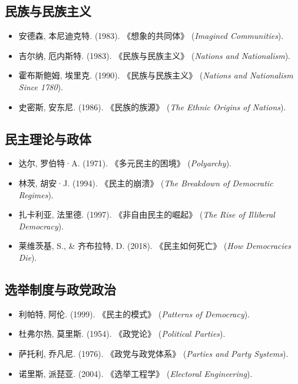\documentclass[a5paper, 11pt, openany]{ctexbook}
\begin{document}
\subsection*{民族与民族主义}
\begin{itemize}
    \item 安德森, 本尼迪克特. (1983). 《想象的共同体》 (\textit{Imagined Communities}).
    \item 吉尔纳, 厄内斯特. (1983). 《民族与民族主义》 (\textit{Nations and Nationalism}).
    \item 霍布斯鲍姆, 埃里克. (1990). 《民族与民族主义》 (\textit{Nations and Nationalism Since 1780}).
    \item 史密斯, 安东尼. (1986). 《民族的族源》 (\textit{The Ethnic Origins of Nations}).
\end{itemize}

\subsection*{民主理论与政体}
\begin{itemize}
    \item 达尔, 罗伯特·A. (1971). 《多元民主的困境》 (\textit{Polyarchy}).
    \item 林茨, 胡安·J. (1994). 《民主的崩溃》 (\textit{The Breakdown of Democratic Regimes}).
    \item 扎卡利亚, 法里德. (1997). 《非自由民主的崛起》 (\textit{The Rise of Illiberal Democracy}).
    \item 莱维茨基, S., \& 齐布拉特, D. (2018). 《民主如何死亡》 (\textit{How Democracies Die}).
\end{itemize}

\subsection*{选举制度与政党政治}
\begin{itemize}
    \item 利帕特, 阿伦. (1999). 《民主的模式》 (\textit{Patterns of Democracy}).
    \item 杜弗尔热, 莫里斯. (1954). 《政党论》 (\textit{Political Parties}).
    \item 萨托利, 乔凡尼. (1976). 《政党与政党体系》 (\textit{Parties and Party Systems}).
    \item 诺里斯, 派琵亚. (2004). 《选举工程学》 (\textit{Electoral Engineering}).
\end{itemize}
\end{document}

